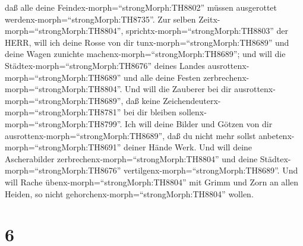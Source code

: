 daß alle deine Feindex-morph=``strongMorph:TH8802'' müssen ausgerottet
werdenx-morph=``strongMorph:TH8735''.  Zur selben
Zeitx-morph=``strongMorph:TH8804'',
sprichtx-morph=``strongMorph:TH8803'' der HERR, will ich deine Rosse von
dir tunx-morph=``strongMorph:TH8689'' und deine Wagen zunichte
machenx-morph=``strongMorph:TH8689'';  und will die
Städtex-morph=``strongMorph:TH8676'' deines Landes
ausrottenx-morph=``strongMorph:TH8689'' und alle deine Festen
zerbrechenx-morph=``strongMorph:TH8804''.  Und will die
Zauberer bei dir ausrottenx-morph=``strongMorph:TH8689'', daß keine
Zeichendeuterx-morph=``strongMorph:TH8781'' bei dir bleiben
sollenx-morph=``strongMorph:TH8799''.  Ich will deine
Bilder und Götzen von dir ausrottenx-morph=``strongMorph:TH8689'', daß
du nicht mehr sollst anbetenx-morph=``strongMorph:TH8691'' deiner Hände
Werk.  Und will deine Ascherabilder
zerbrechenx-morph=``strongMorph:TH8804'' und deine
Städtex-morph=``strongMorph:TH8676''
vertilgenx-morph=``strongMorph:TH8689''.  Und will Rache
übenx-morph=``strongMorph:TH8804'' mit Grimm und Zorn an allen Heiden,
so nicht gehorchenx-morph=``strongMorph:TH8804'' wollen.

\hypertarget{section-5}{%
\section{6}\label{section-5}}

